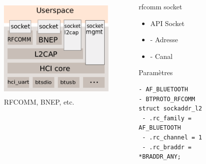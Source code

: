 \begin{frame}[fragile]
\begin{columns}[t]
\begin{column}{0.60\linewidth}
	\begin{figure}
		\includegraphics[height=5cm]{bluez_kernel.png}
		\caption{RFCOMM, BNEP, etc.}
	\end{figure}
\end{column}
\begin{column}{0.40\linewidth}
	\begin{block}{rfcomm socket}
		\begin{itemize}
			\item API Socket
			\item - Adresse
			\item - Canal
		\end{itemize}
	\end{block}
	\begin{block}{Paramètres}
		\begin{Verbatim}[fontsize=\tiny]
- AF_BLUETOOTH
- BTPROTO_RFCOMM
struct sockaddr_l2
 - .rc_family = AF_BLUETOOTH
 - .rc_channel = 1
 - .rc_braddr = *BRADDR_ANY;
		\end{Verbatim}
	\end{block}

\end{column}
\end{columns}
\end{frame}

